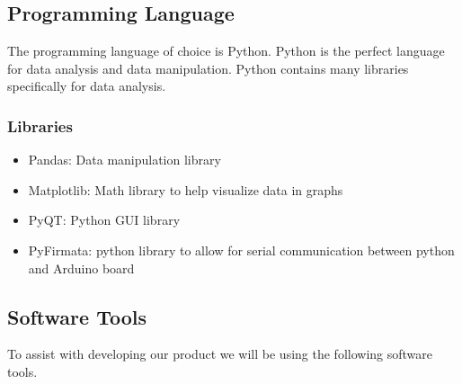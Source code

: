 \documentclass{article}
\begin{document}
\subsection{Programming Language}

The programming language of choice is Python. Python is the perfect language for data analysis and data manipulation. Python contains many libraries specifically for data analysis. 

\subsubsection{Libraries}
\begin{itemize}
	\item Pandas: Data manipulation library
	\item Matplotlib: Math library to help visualize data in graphs
	\item PyQT: Python GUI library
	\item PyFirmata: python library to allow for serial communication between python and Arduino board
\end{itemize}


\subsection{Software Tools}
To assist with developing our product we will be using the following software tools.
\end{document}
